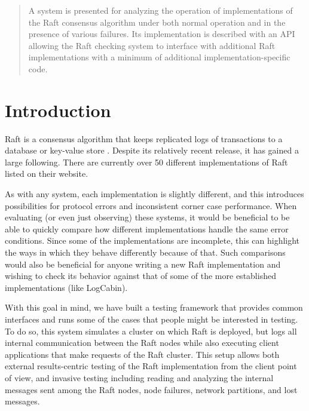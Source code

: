 \documentclass[UTF8]{article}
\begin{document}
 

\setlength\parindent{24pt}

\begin{abstract}
	
A system is presented for analyzing the operation of implementations of the Raft consensus algorithm under both normal operation and in the presence of various failures. Its implementation is described with an API allowing the Raft checking system to interface with additional Raft implementations with a minimum of additional implementation-specific code.

\end{abstract} 

\section{Introduction}

Raft is a consensus algorithm that keeps replicated logs of transactions to a database or key-value store \cite{raftPaper}. Despite its relatively recent release, it has gained a large following. There are currently over 50 different implementations of Raft listed on their website.
 
As with any system, each implementation is slightly different, and this introduces possibilities for protocol errors and inconsistent corner case performance. When evaluating (or even just observing) these systems, it would be beneficial to be able to quickly compare how different implementations handle the same error conditions. Since some of the implementations are incomplete, this can highlight the ways in which they behave differently because of that. Such comparisons would also be beneficial for anyone writing a new Raft implementation and wishing to check its behavior against that of some of the more established implementations (like LogCabin). 

With this goal in mind, we have built a testing framework that provides common interfaces and runs some of the cases that people might be interested in testing. To do so, this system simulates a cluster on which Raft is deployed, but logs all internal communication between the Raft nodes while also executing client applications that make requests of the Raft cluster. This setup allows both external results-centric testing of the Raft implementation from the client point of view, and invasive testing including reading and analyzing the internal messages sent among the Raft nodes, node failures, network partitions, and lost messages.
\end{document}
